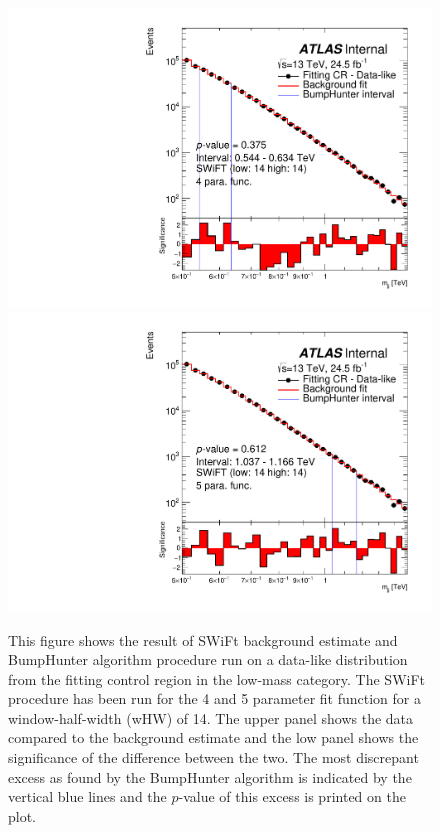 \begin{figure}[!htb]
\captionsetup[subfigure]{aboveskip=0pt,justification=centering}
\centering
 {
  \includegraphics[width=0.45\linewidth, angle=0]{figs/Dibjet/LowMass/FitStudy/bhFit_corrFitCR_dataLike_v13_4para_low14_high14.pdf}
}
 {
  \includegraphics[width=0.45\linewidth, angle=0]{figs/Dibjet/LowMass/FitStudy/bhFit_corrFitCR_dataLike_v13_5para_low14_high14.pdf}
}
\vspace{10pt}
\caption{\label{fig:bhFit_lm_corrFitCR_dataLike}
  This figure shows the result of SWiFt background estimate and {\sc BumpHunter} algorithm procedure run on a data-like distribution
  from the fitting control region in the low-mass category.
  The SWiFt procedure has been run for the 4 and 5 parameter fit function for a window-half-width (wHW) of 14.
  The upper panel shows the data compared to the background estimate and the low panel shows the significance of the difference between the two.
  The most discrepant excess as found by the {\sc BumpHunter} algorithm is indicated by the vertical blue lines and the $p$-value of this excess is printed on the plot. 
}
\end{figure}

